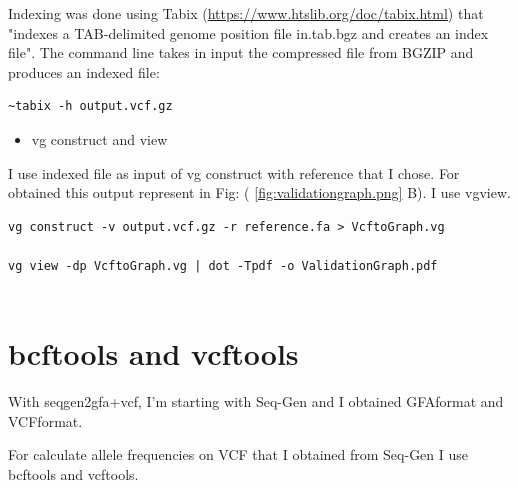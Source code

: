 Indexing was done using Tabix (\url{https://www.htslib.org/doc/tabix.html}) that "indexes a TAB-delimited genome position file in.tab.bgz and creates an index file". 
The command line takes in input the compressed file from BGZIP and produces an indexed file: 

\begin{verbatim}
~tabix -h output.vcf.gz  
\end{verbatim}

\begin{itemize}
\item  vg construct and view
\end{itemize}
I use indexed file as input of vg construct with reference that I chose. For obtained this output represent in Fig: ( \ref{fig:validationgraph.png} B). I use vgview.

\begin{verbatim}
vg construct -v output.vcf.gz -r reference.fa > VcftoGraph.vg

vg view -dp VcftoGraph.vg | dot -Tpdf -o ValidationGraph.pdf


\end{verbatim}

\section{bcftools and vcftools}

With seqgen2gfa+vcf, I'm starting with Seq-Gen and I obtained GFAformat and VCFformat. 

For calculate allele frequencies on VCF that I obtained from Seq-Gen I use bcftools and vcftools.


